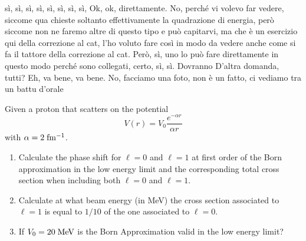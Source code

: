 \begin{soluzione}
sì, sì, sì, sì, sì, sì, sì, sì, Ok, ok, direttamente. No, perché vi volevo far vedere, siccome qua chieste soltanto effettivamente la quadrazione di energia, però siccome non ne faremo altre di questo tipo e può capitarvi, ma che è un esercizio qui della correzione al cat, l'ho voluto fare così in modo da vedere anche come si fa il tattore della correzione al cat. Però, sì, uno lo può fare direttamente in questo modo perché sono collegati, certo, sì, sì. Dovranno D'altra domanda, tutti? Eh, va bene, va bene. No, facciamo una foto, non è un fatto, ci vediamo tra un battu d'orale
\end{soluzione}

\newpage
\setcounter{equation}{0}

\begin{esercizio}
   Given a proton that scatters on the potential
   \begin{equation*}
      V(r)
      =V_0 \frac{e^{-\alpha r}}{\alpha r}
   \end{equation*}
   with $\alpha=2 \; \rm fm^{-1}$.
   \begin{enumerate}[label=\alph*), leftmargin=0.6cm]
      \item Calculate the phase shift for $\ell=0$ and $\ell=1$ at first order of the Born approximation in the low energy limit and the corresponding total cross section when including both $\ell=0$ and $\ell=1$.
      \item Calculate at what beam energy (in MeV) the cross section associated to $\ell=1$ is equal to $1/10$ of the one associated to $\ell=0$.
      \item If $V_0=20 \rm \; MeV$ is the Born Approximation valid in the low energy limit?
   \end{enumerate}
\end{esercizio}
